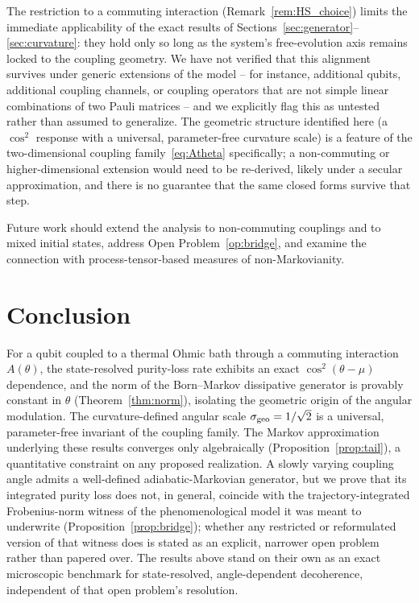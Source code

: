 \documentclass[aps,pra,reprint,superscriptaddress,nofootinbib,longbibliography]{revtex4-2}
\begin{document}
The restriction to a commuting interaction (Remark~\ref{rem:HS_choice})
limits the immediate applicability of the exact results of
Sections~\ref{sec:generator}--\ref{sec:curvature}: they hold only so
long as the system's free-evolution axis remains locked to the
coupling geometry. We have not verified that this alignment survives
under generic extensions of the model -- for instance, additional
qubits, additional coupling channels, or coupling operators that are
not simple linear combinations of two Pauli matrices -- and we
explicitly flag this as untested rather than assumed to generalize.
The geometric structure identified here (a $\cos^2$ response with a
universal, parameter-free curvature scale) is a feature of the
two-dimensional coupling family~\eqref{eq:Atheta} specifically; a
non-commuting or higher-dimensional extension would need to be
re-derived, likely under a secular approximation, and there is no
guarantee that the same closed forms survive that step.

Future work should extend the analysis to non-commuting couplings and
to mixed initial states, address Open Problem~\ref{op:bridge}, and
examine the connection with process-tensor-based measures of
non-Markovianity.

\section{Conclusion}
\label{sec:conclusion}

For a qubit coupled to a thermal Ohmic bath through a commuting
interaction $A(\theta)$, the state-resolved purity-loss rate exhibits
an exact $\cos^2(\theta-\mu)$ dependence, and the norm of the
Born--Markov dissipative generator is provably constant in $\theta$
(Theorem~\ref{thm:norm}), isolating the geometric origin of the
angular modulation. The curvature-defined angular scale
$\sigma_{\rm geo}=1/\sqrt2$ is a universal, parameter-free invariant of
the coupling family. The Markov approximation underlying these results
converges only algebraically (Proposition~\ref{prop:tail}), a
quantitative constraint on any proposed realization. A slowly varying
coupling angle admits a well-defined adiabatic-Markovian generator,
but we prove that its integrated purity loss does not, in
general, coincide with the trajectory-integrated Frobenius-norm
witness of the phenomenological model it was meant to underwrite
(Proposition~\ref{prop:bridge}); whether any restricted or
reformulated version of that witness does is stated as an explicit,
narrower open problem rather than papered over. The results
above stand on their own as an exact microscopic benchmark for
state-resolved, angle-dependent decoherence, independent of that
open problem's resolution.
\end{document}

